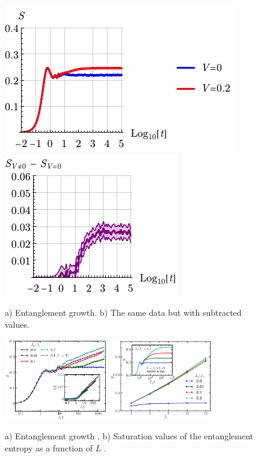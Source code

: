 
\begin{figure}[h]
    \centering
     \hspace{2 mm} 
    \includegraphics[align=c]{imgs/S_FV1.pdf}
    \hspace{10 mm} 
     \hspace{2 mm} 
    \includegraphics[align=c]{imgs/S_FV2.pdf}
    \caption{a) Entanglement growth. b) The same data but with subtracted values.}
\end{figure}




\begin{figure}[h]
    \centering
    \includegraphics[width=0.4\textwidth]{imgs/S_FV_12a.png}
    \hspace{10 mm} 
    \includegraphics[width=0.4\textwidth]{imgs/S_FV_12b.png}
    \caption{
        a) Entanglement growth \cite{bardarson_unbounded_2012}.
        b) Saturation values of the entanglement entropy as a function of $L$ \cite{bardarson_unbounded_2012}.
    }
\end{figure}
